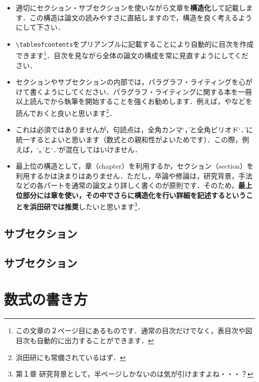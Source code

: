 \documentclass[dvipdfmx,autodetect-engine]{jsreport}
\begin{document}
\begin{itemize}
\item 適切にセクション・サブセクションを使いながら文章を\textbf{構造化}して記載します．この構造は論文の読みやすさに直結しますので，構造を良く考えるようにして下さい．
\item \texttt{\textbackslash tableofcontents}をプリアンブルに記載することにより自動的に目次を作成できます\footnote{この文章の２ページ目にあるものです．通常の目次だけでなく，表目次や図目次も自動的に出力することができます．}．目次を見ながら全体の論文の構成を常に見直すようにしてください．
\item セクションやサブセクションの内部では，パラグラフ・ライティングを心がけて書くようにしてください．パラグラフ・ライティングに関する本を一冊以上読んでから執筆を開始することを強くお勧めします．例えば，\cite{倉島201211}や\cite{木下198109}などを読んでおくと良いと思います\footnote{浜田研にも常備されているはず．}．
\item これは必須ではありませんが，句読点は，全角カンマ`，'と全角ピリオド`．'に統一するとよいと思います（数式との親和性がよいためです）．この際，例えば，`。'と`．'が混在してはいけません．
\item 最上位の構造として，章（chapter）を利用するか，セクション（section）を利用するかは決まりはありません．ただし，卒論や修論は，研究背景，手法などの各パートを通常の論文より詳しく書くのが原則です．そのため，\textbf{最上位部分には章を使い，その中でさらに構造化を行い詳細を記述するということを浜田研では推奨}したいと思います\footnote{第１章 研究背景として，半ページしかないのは気が引けますよね・・・？}．
\end{itemize}

\subsection{サブセクション}


\subsection{サブセクション}

\section{数式の書き方}
\end{document}
